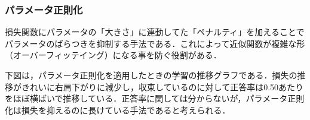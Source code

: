 \documentclass[uplatex,titlepage]{jsarticle}
\newif\iffigure
\begin{document}
\subsubsection{パラメータ正則化}
損失関数にパラメータの「大きさ」に連動してた「ペナルティ」を加えることでパラメータのばらつきを抑制する手法である．これによって近似関数が複雑な形（オーバーフィッテイング）になる事を防ぐ役割がある．
\iffigure
\begin{figure}[H]%
    \begin{center}
    \texttt{[image: param\_regular\_model.png]} 
    \caption{パラメータ正則化のモデル}
    \end{center}
\end{figure}
\fi
下図は，パラメータ正則化を適用したときの学習の推移グラフである．損失の推移がきれいに右肩下がりに減少し，収束しているのに対して正答率は0.50あたりをほぼ横ばいで推移している．正答率に関しては分からないが，パラメータ正則化は損失を抑えるのに長けている手法であると考えられる．
\iffigure
\begin{figure}[H]
\begin{minipage}{8cm}%
  \begin{center}
   \texttt{[image: param\_regular\_acc.png]} \\
   \caption{パラメータ正則化したときの正答率の推移}
  \end{center}
\end{minipage}
\hfill
\begin{minipage}{8cm}%
  \begin{center}
    \texttt{[image: param\_regular\_loss.png]} \\
    \caption{パラメータ正則化したときの損失の推移}
  \end{center}
\end{minipage}
\end{figure}
\fi
\end{document}
